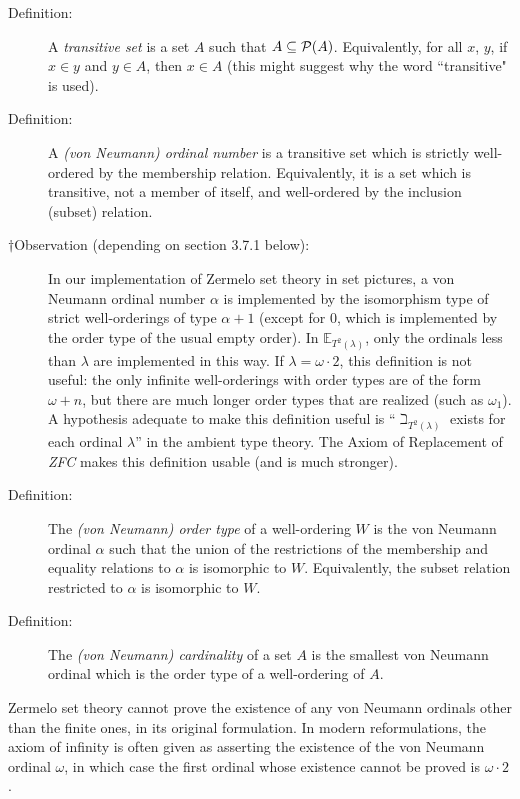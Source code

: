 \documentclass[12pt]{book}
\begin{document}
\begin{description}

\item[Definition:]  A {\em transitive set\/} is a set $A$ such that $A \subseteq {\cal P}(A)$.  Equivalently, for all $x$, $y$, if $x \in y$ and $y \in A$, then $x \in A$ (this might suggest why the word ``transitive" is used).

\item[Definition:] A {\em (von Neumann) ordinal number\/} is a
transitive set which is strictly well-ordered by the membership
relation.  Equivalently, it is a set which is transitive, not a member of itself, and well-ordered by the inclusion (subset) relation.

\item[$\dagger$Observation (depending on section 3.7.1 below):] In our implementation of Zermelo set theory in set
pictures, a von Neumann ordinal number $\alpha$ is implemented by the
isomorphism type of strict well-orderings of type $\alpha+1$ (except
for 0, which is implemented by the order type of the usual empty
order).  In ${\mathbb E}_{T^2(\lambda)}$, only the ordinals less than
$\lambda$ are implemented in this way.  If $\lambda=\omega\cdot 2$,
this definition is not useful: the only infinite well-orderings with
order types are of the form $\omega+n$, but there are much longer
order types that are realized (such as $\omega_1$).  A hypothesis
adequate to make this definition useful is ``$\beth_{T^2(\lambda)}$
exists for each ordinal $\lambda$'' in the ambient type theory.  The
Axiom of Replacement of {\em ZFC\/} makes this definition usable (and
is much stronger).

\item[Definition:] The {\em (von Neumann) order type\/} of a
well-ordering $W$ is the von Neumann ordinal $\alpha$ such that the
union of the restrictions of the membership and equality relations to $\alpha$ is isomorphic to $W$.   Equivalently, the subset relation restricted to $\alpha$ is isomorphic to $W$.

\item[Definition:] The {\em (von Neumann) cardinality\/} of a set $A$
is the smallest von Neumann ordinal which is the order type of a
well-ordering of $A$.

\end{description}

Zermelo set theory cannot prove the existence of any von Neumann ordinals other than the finite ones, in its original formulation.  In modern reformulations, the axiom of infinity is often given as asserting the existence of the von Neumann ordinal $\omega$, in which case the first ordinal whose existence cannot be proved is $\omega \cdot 2$.
\end{document}
